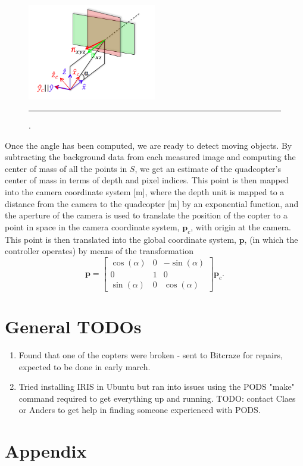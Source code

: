 \documentclass{article}
\begin{document}
\begin{figure}[htbp]
\centering
\includegraphics[width=0.5\textwidth]{figures/kinectcal.png}
\rule{35em}{0.5pt}
\caption{.}
\label{fig:planecalibration}
\end{figure}

Once the angle has been computed, we are ready to detect moving objects. By subtracting the background data from each measured image and computing the center of mass of all the points in $S$, we get an estimate of the quadcopter's center of mass in terms of depth and pixel indices. This point is then mapped into the camera coordinate system [m], where the depth unit is mapped to a distance from the camera to the quadcopter [m] by an exponential function, and the aperture of the camera is used to translate the position of the copter to a point in space in the camera coordinate system, $\mathbf{p}_c$, with origin at the camera. This point is then translated into the global coordinate system, $\mathbf{p}$, (in which the controller operates) by means of the transformation
\begin{equation}
\mathbf{p} = \begin{bmatrix} \cos(\alpha)& 0 & -\sin(\alpha) \\ 0 & 1 & 0 \\ \sin(\alpha) & 0 & \cos(\alpha)\end{bmatrix} \mathbf{p}_c.
\end{equation}

\section{General TODOs}
\begin{enumerate}
\item Found that one of the copters were broken - sent to Bitcraze for repairs, expected to be done in early march.
\item Tried installing IRIS in Ubuntu but ran into issues using the PODS "make" command required to get everything up and running. TODO: contact Claes or Anders to get help in finding someone experienced with PODS.
\end{enumerate}

\newpage{}


\section{Appendix}\label{sec:appendix}
\end{document}
